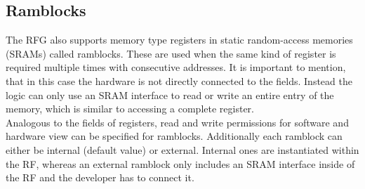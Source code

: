 \subsection{Ramblocks}
The RFG also supports memory type registers in static random-access memories (SRAMs) called ramblocks. These are used when the same kind of register is required multiple times with consecutive addresses. It is important to mention, that in this case the hardware is not directly connected to the fields. Instead the logic can only use an SRAM interface to read or write an entire entry of the memory, which is similar to accessing a complete register.\\
Analogous to the fields of registers, read and write permissions for software and hardware view can be specified for ramblocks. Additionally each ramblock can either be internal (default value) or external. Internal ones are instantiated within the RF, whereas an external ramblock only includes an SRAM interface inside of the RF and the developer has to connect it.
